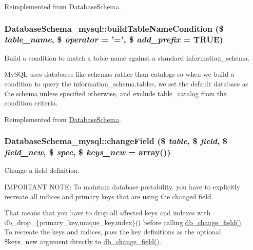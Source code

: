 Reimplemented from \hyperlink{classDatabaseSchema_ac2e6358da1c2d38fe6a1a1d003dac8ca}{DatabaseSchema}.\hypertarget{classDatabaseSchema__mysql_ae4fdb93f71666ee453610344b34d6763}{
\subsubsection[{buildTableNameCondition}]{\setlength{\rightskip}{0pt plus 5cm}DatabaseSchema\_\-mysql::buildTableNameCondition (\$ {\em table\_\-name}, \/  \$ {\em operator} = {\ttfamily '='}, \/  \$ {\em add\_\-prefix} = {\ttfamily TRUE})}}
\label{classDatabaseSchema__mysql_ae4fdb93f71666ee453610344b34d6763}
Build a condition to match a table name against a standard information\_\-schema.

MySQL uses databases like schemas rather than catalogs so when we build a condition to query the information\_\-schema.tables, we set the default database as the schema unless specified otherwise, and exclude table\_\-catalog from the condition criteria. 

Reimplemented from \hyperlink{classDatabaseSchema_a4a2510c6b95598b613355d1a9b9a706f}{DatabaseSchema}.\hypertarget{classDatabaseSchema__mysql_a7da23695df0408c0b8d0bbb95bf32ef6}{
\subsubsection[{changeField}]{\setlength{\rightskip}{0pt plus 5cm}DatabaseSchema\_\-mysql::changeField (\$ {\em table}, \/  \$ {\em field}, \/  \$ {\em field\_\-new}, \/  \$ {\em spec}, \/  \$ {\em keys\_\-new} = {\ttfamily array()})}}
\label{classDatabaseSchema__mysql_a7da23695df0408c0b8d0bbb95bf32ef6}
Change a field definition.

IMPORTANT NOTE: To maintain database portability, you have to explicitly recreate all indices and primary keys that are using the changed field.

That means that you have to drop all affected keys and indexes with db\_\-drop\_\-\{primary\_\-key,unique\_\-key,index\}() before calling \hyperlink{group__schemaapi_ga9e0a4211eb8137e187d5f3f4fa716cea}{db\_\-change\_\-field()}. To recreate the keys and indices, pass the key definitions as the optional \$keys\_\-new argument directly to \hyperlink{group__schemaapi_ga9e0a4211eb8137e187d5f3f4fa716cea}{db\_\-change\_\-field()}.

